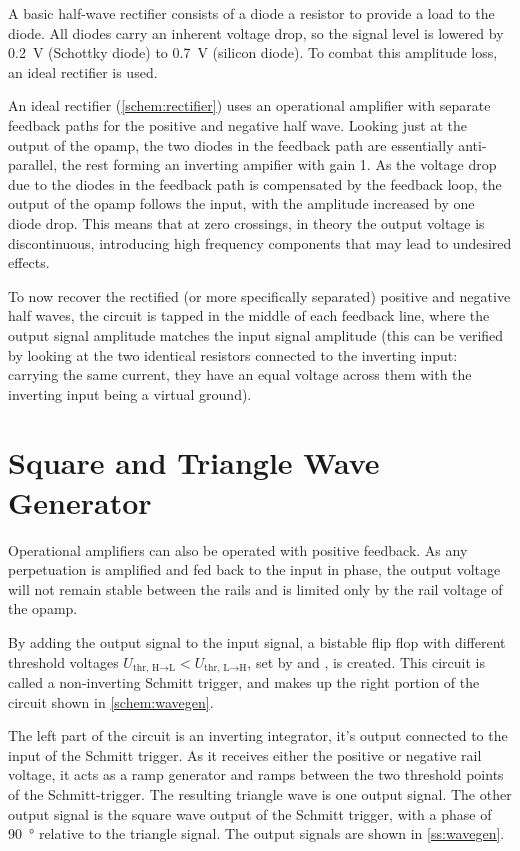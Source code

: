
A basic half-wave rectifier consists of a diode a resistor to provide a load to the diode.
All diodes carry an inherent voltage drop, so the signal level is lowered by \SI{0.2}{\volt} (Schottky diode) to \SI{0.7}{\volt} (silicon diode).
To combat this amplitude loss, an ideal rectifier is used.

An ideal rectifier (\autoref{schem:rectifier}) uses an operational amplifier with separate feedback paths for the positive and negative half wave.
Looking just at the output of the opamp, the two diodes in the feedback path are essentially anti-parallel, the rest forming an inverting ampifier with gain 1.
As the voltage drop due to the diodes in the feedback path is compensated by the feedback loop, the output of the opamp follows the input, with the amplitude increased by one diode drop.
This means that at zero crossings, in theory the output voltage is discontinuous, introducing high frequency components that may lead to undesired effects.

To now recover the rectified (or more specifically separated) positive and negative half waves, the circuit is tapped in the middle of each feedback line, where the output signal amplitude matches the input signal amplitude (this can be verified by looking at the two identical resistors connected to the inverting input: carrying the same current, they have an equal voltage across them with the inverting input being a virtual ground).

\section{Square and Triangle Wave Generator}

Operational amplifiers can also be operated with positive feedback.
As any perpetuation is amplified and fed back to the input in phase, the output voltage will not remain stable between the rails and is limited only by the rail voltage of the opamp.

By adding the output signal to the input signal, a bistable flip flop with different threshold voltages $U_{\text{thr, H} \rightarrow \text{L}} < U_{\text{thr, L} \rightarrow \text{H}}$, set by  and , is created.
This circuit is called a non-inverting Schmitt trigger, and makes up the right portion of the circuit shown in \autoref{schem:wavegen}.

The left part of the circuit is an inverting integrator, it's output connected to the input of the Schmitt trigger.
As it receives either the positive or negative rail voltage, it acts as a ramp generator and ramps between the two threshold points of the Schmitt-trigger.
The resulting triangle wave is one output signal.
The other output signal is the square wave output of the Schmitt trigger, with a phase of \SI{90}{\degree} relative to the triangle signal.
The output signals are shown in \autoref{ss:wavegen}.


